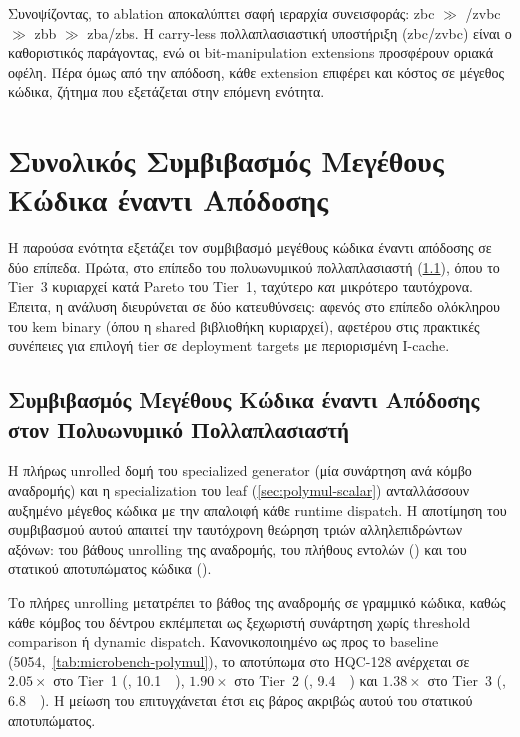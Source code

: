 Συνοψίζοντας, το ablation αποκαλύπτει σαφή ιεραρχία συνεισφοράς: \gls{zbc} $\gg$ \RVV/\gls{zvbc} $\gg$ \gls{zbb} $\gg$ \gls{zba}/\gls{zbs}. Η carry-less πολλαπλασιαστική υποστήριξη (\gls{zbc}/\gls{zvbc}) είναι ο καθοριστικός παράγοντας, ενώ οι bit-manipulation extensions προσφέρουν οριακά οφέλη. Πέρα όμως από την απόδοση, κάθε extension επιφέρει και κόστος σε μέγεθος κώδικα, ζήτημα που εξετάζεται στην επόμενη ενότητα.

\section{Συνολικός Συμβιβασμός Μεγέθους Κώδικα έναντι Απόδοσης}
\label{sec:code-size-tradeoff}

Η παρούσα ενότητα εξετάζει τον συμβιβασμό μεγέθους κώδικα έναντι απόδοσης σε
δύο επίπεδα. Πρώτα, στο επίπεδο του πολυωνυμικού πολλαπλασιαστή
(\cref{sec:polymul-codesize}), όπου το Tier~3 κυριαρχεί κατά Pareto του Tier~1,
ταχύτερο \emph{και} μικρότερο ταυτόχρονα. Έπειτα, η ανάλυση διευρύνεται σε δύο
κατευθύνσεις: αφενός στο επίπεδο ολόκληρου του \gls{kem} binary (όπου η shared
 βιβλιοθήκη κυριαρχεί), αφετέρου στις πρακτικές συνέπειες για
επιλογή tier σε deployment targets με περιορισμένη I-cache.

\subsection{Συμβιβασμός Μεγέθους Κώδικα έναντι Απόδοσης στον Πολυωνυμικό Πολλαπλασιαστή}
\label{sec:polymul-codesize}

Η πλήρως unrolled δομή του specialized generator (μία συνάρτηση ανά κόμβο αναδρομής) και η specialization του leaf
(\cref{sec:polymul-scalar}) ανταλλάσσουν αυξημένο μέγεθος κώδικα με την
απαλοιφή κάθε runtime dispatch. Η αποτίμηση του συμβιβασμού αυτού απαιτεί την
ταυτόχρονη θεώρηση τριών αλληλεπιδρώντων αξόνων: του βάθους unrolling της
αναδρομής, του πλήθους εντολών (\instret) και του στατικού αποτυπώματος κώδικα
().

Το πλήρες unrolling μετατρέπει το βάθος της αναδρομής σε γραμμικό κώδικα,
καθώς κάθε κόμβος του δέντρου εκπέμπεται ως ξεχωριστή  συνάρτηση
χωρίς threshold comparison ή dynamic dispatch. Κανονικοποιημένο ως προς το
 baseline (\SI{5054}{\byte},~\cref{tab:microbench-polymul}),
το αποτύπωμα στο HQC-128 ανέρχεται σε $2.05\times$ στο Tier~1
(, \SI{10.1}{\kilo\byte}), $1.90\times$ στο Tier~2
(, \SI{9.4}{\kilo\byte}) και $1.38\times$ στο Tier~3
(, \SI{6.8}{\kilo\byte}). Η μείωση του \instret
επιτυγχάνεται έτσι εις βάρος ακριβώς αυτού του στατικού αποτυπώματος.

